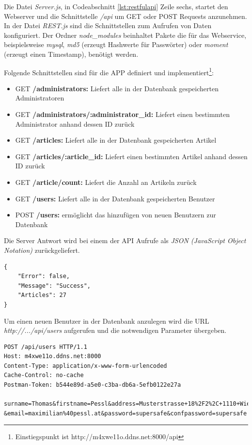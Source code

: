 	Die Datei \textit{Server.js}, in Codeabschnitt \ref{lst:restfulapi} Zeile sechs, startet den Webserver und die Schnittstelle \textit{/api} um GET oder POST Requests anzunehmen. In der Datei \textit{REST.js} sind die Schnittstellen zum Aufrufen von Daten konfiguriert. Der Ordner \textit{node\_modules} beinhaltet Pakete die für das Webservice, beispielsweise \textit{mysql}, \textit{md5} (erzeugt Hashwerte für Passwörter) oder \textit{moment} (erzeugt einen Timestamp), benötigt werden.

	Folgende Schnittstellen sind für die APP definiert und implementiert\footnote{Einstiegspunkt ist http://m4xwe11o.ddns.net:8000/api}:
	\begin{itemize}
		\setlength\itemsep{0em}
		\item GET \textbf{/administrators:} Liefert alle in der Datenbank gespeicherten Administratoren
		\item GET \textbf{/administrators/:administrator\_id:} Liefert einen bestimmten Administrator anhand dessen ID zurück
		\item GET \textbf{/articles:} Liefert alle in der Datenbank gespeicherten Artikel
		\item GET \textbf{/articles/:article\_id:} Liefert einen bestimmten Artikel anhand dessen ID zurück
		\item GET \textbf{/article/count:} Liefert die Anzahl an Artikeln zurück
		\item GET \textbf{/users:} Liefert alle in der Datenbank gespeicherten Benutzer
		\item POST \textbf{/users:} ermöglicht das hinzufügen von neuen Benutzern zur Datenbank
	\end{itemize}

	Die Server Antwort wird bei einem der API Aufrufe als \textit{JSON (JavaScript Object Notation)} zurückgeliefert.
	\begin{lstlisting}[caption={Serverantwort - \textbf{/article/count:} API Call },label={lst:restfulapicallcount},captionpos=b,style=JAVA-Own]
{
    "Error": false,
    "Message": "Success",
    "Articles": 27
}
	\end{lstlisting}

	Um einen neuen Benutzer in der Datenbank anzulegen wird die URL \textit{http://.../api/users} aufgerufen und die notwendigen Parameter übergeben. 

	\begin{lstlisting}[caption={Anlegen eines neuen Benutzers durch URL Encoding},label={lst:restfulapicallnewuser},captionpos=b,style=JAVA-Own]
POST /api/users HTTP/1.1
Host: m4xwe11o.ddns.net:8000
Content-Type: application/x-www-form-urlencoded
Cache-Control: no-cache
Postman-Token: b544e89d-a5e0-c3ba-db6a-5efb0122e27a

surname=Thomas&firstname=Pessl&address=Musterstrasse+18%2F2%2C+1110+Wien
&email=maximilian%40pessl.at&password=supersafe&confpassword=supersafe
	\end{lstlisting}

